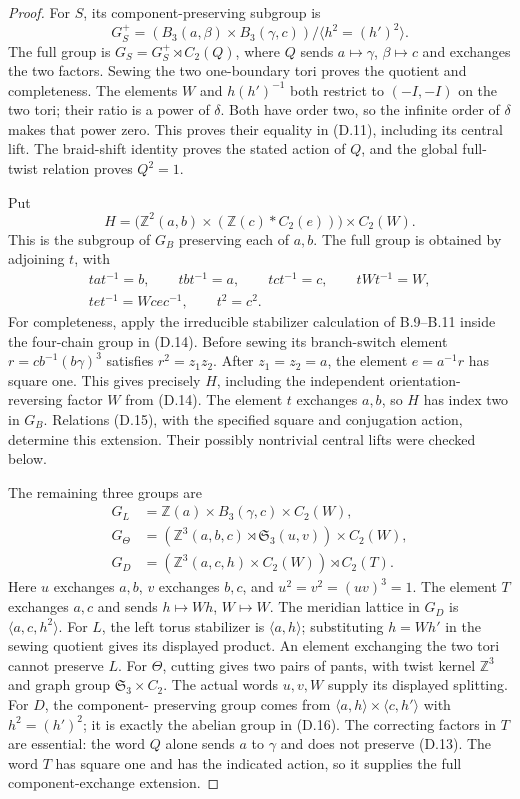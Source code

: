 \begin{proof}
For $S$, its component-preserving subgroup is
\[
 G_S^+=
 (B_3(a,\beta)\times B_3(\gamma,c))
       /\langle h^2=(h')^2\rangle.
\]
The full group is $G_S=G_S^+\rtimes C_2(Q)$, where $Q$
sends $a\mapsto\gamma$, $\beta\mapsto c$ and exchanges
the two factors.  Sewing the two one-boundary tori proves
the quotient and completeness.  The elements $W$ and
$h(h')^{-1}$ both restrict to $(-I,-I)$ on the two tori;
their ratio is a power of $\delta$.  Both have order two,
so the infinite order of $\delta$ makes that power zero.
This proves their equality in (D.11), including its central
lift.  The braid-shift identity proves the stated action
of $Q$, and the global full-twist relation proves $Q^2=1$.

Put
\[
 H=\bigl(\mathbb Z^2(a,b)\times
          (\mathbb Z(c)*C_2(e))\bigr)\times C_2(W).
\]
This is the subgroup of $G_B$ preserving each of $a,b$.
The full group is obtained by adjoining $t$, with
\[
\begin{gathered}
 tat^{-1}=b,\qquad tbt^{-1}=a,\qquad tct^{-1}=c,
 \qquad tWt^{-1}=W,\\
 tet^{-1}=Wcec^{-1},\qquad t^2=c^2.                            \tag{D.15}
\end{gathered}
\]
For completeness, apply the irreducible stabilizer calculation
of B.9--B.11 inside the four-chain group in (D.14).
Before sewing its branch-switch element
$r=cb^{-1}(b\gamma)^3$ satisfies $r^2=z_1z_2$.
After $z_1=z_2=a$, the element $e=a^{-1}r$ has square one.
This gives precisely $H$, including the independent
orientation-reversing factor $W$ from (D.14).
The element $t$ exchanges $a,b$, so $H$ has index two in
$G_B$.  Relations (D.15), with the specified square and
conjugation action, determine this extension.  Their
possibly nontrivial central lifts were checked below.

The remaining three groups are
\[
\begin{split}
 G_L&=\mathbb Z(a)\times B_3(\gamma,c)\times C_2(W),\\
 G_\Theta&=(\mathbb Z^3(a,b,c)\rtimes\mathfrak S_3(u,v))
                    \times C_2(W),\\
 G_D&=(\mathbb Z^3(a,c,h)\times C_2(W))\rtimes C_2(T).
\end{split}                                                       \tag{D.16}
\]
Here $u$ exchanges $a,b$, $v$ exchanges $b,c$, and
$u^2=v^2=(uv)^3=1$.  The element $T$ exchanges $a,c$
and sends $h\mapsto Wh$, $W\mapsto W$.
The meridian lattice in $G_D$ is $\langle a,c,h^2\rangle$.
For $L$, the left torus stabilizer is
$\langle a,h\rangle$; substituting $h=Wh'$ in the sewing
quotient gives its displayed product.  An element exchanging
the two tori cannot preserve $L$.
For $\Theta$, cutting gives two pairs of pants, with twist
kernel $\mathbb Z^3$ and graph group
$\mathfrak S_3\times C_2$.  The actual words $u,v,W$
supply its displayed splitting.  For $D$, the component-
preserving group comes from
$\langle a,h\rangle\times\langle c,h'\rangle$ with
$h^2=(h')^2$; it is exactly the abelian group in (D.16).
The correcting factors in $T$ are essential: the word $Q$
alone sends $a$ to $\gamma$ and does not preserve (D.13).
The word $T$ has square one and has the indicated action,
so it supplies the full component-exchange extension.


\end{proof}
